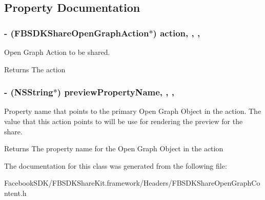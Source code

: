 \subsection{Property Documentation}
\hypertarget{interface_f_b_s_d_k_share_open_graph_content_ad9e4ab55026e417b3c04f7b73d53f392}{
\subsubsection[{action}]{\setlength{\rightskip}{0pt plus 5cm}-\/ ({\bf F\-B\-S\-D\-K\-Share\-Open\-Graph\-Action}$\ast$) action\hspace{0.3cm}{\ttfamily [read]}, {\ttfamily [write]}, {\ttfamily [nonatomic]}, {\ttfamily [copy]}}}\label{interface_f_b_s_d_k_share_open_graph_content_ad9e4ab55026e417b3c04f7b73d53f392}
Open Graph Action to be shared. \begin{DoxyReturn}{Returns}
The action 
\end{DoxyReturn}
\hypertarget{interface_f_b_s_d_k_share_open_graph_content_a138537cb75dbeab1a52aaf27b3bb60e8}{
\subsubsection[{preview\-Property\-Name}]{\setlength{\rightskip}{0pt plus 5cm}-\/ (N\-S\-String$\ast$) preview\-Property\-Name\hspace{0.3cm}{\ttfamily [read]}, {\ttfamily [write]}, {\ttfamily [nonatomic]}, {\ttfamily [copy]}}}\label{interface_f_b_s_d_k_share_open_graph_content_a138537cb75dbeab1a52aaf27b3bb60e8}
Property name that points to the primary Open Graph Object in the action.  The value that this action points to will be use for rendering the preview for the share. \begin{DoxyReturn}{Returns}
The property name for the Open Graph Object in the action 
\end{DoxyReturn}


The documentation for this class was generated from the following file\-:\begin{DoxyCompactItemize}
\item 
Facebook\-S\-D\-K/\-F\-B\-S\-D\-K\-Share\-Kit.\-framework/\-Headers/F\-B\-S\-D\-K\-Share\-Open\-Graph\-Content.\-h\end{DoxyCompactItemize}
